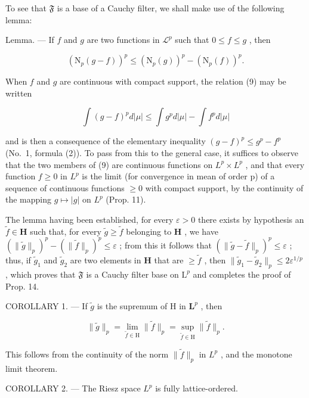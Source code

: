 To see that \(\mathfrak{F}\) is a base of a Cauchy filter, we shall make use of the following lemma:

Lemma. --- If \(f\) and \(g\) are two functions in \(\mathcal{L}^p\) such that \(0 \leqslant f \leqslant g\) , then

\[
\left(\mathrm{N} _ {p} (g - f)\right) ^ {p} \leqslant \left(\mathrm{N} _ {p} (g)\right) ^ {p} - \left(\mathrm{N} _ {p} (f)\right) ^ {p}.\tag{9}
\]

When \(f\) and \(g\) are continuous with compact support, the relation (9) may be written

\[
\int (g - f) ^ {p} d | \mu | \leqslant \int g ^ {p} d | \mu | - \int f ^ {p} d | \mu |
\]

and is then a consequence of the elementary inequality \((g - f)^{p} \leqslant g^{p} - f^{p}\) (No.~1, formula (2)). To pass from this to the general case, it suffices to observe that the two members of (9) are continuous functions on \(L^{p} \times L^{p}\) , and that every function \(f \geqslant 0\) in \(L^{p}\) is the limit (for convergence in mean of order p) of a sequence of continuous functions \(\geqslant 0\) with compact support, by the continuity of the mapping \(g \mapsto |g|\) on \(L^{p}\) (Prop. 11).

The lemma having been established, for every \(\varepsilon > 0\) there exists by hypothesis an \(\widetilde{f} \in \mathbf{H}\) such that, for every \(\widetilde{g} \geqslant \widetilde{f}\) belonging to \(\mathbf{H}\) , we have \((\|\widetilde{g}\|_p)^p - (\|\widetilde{f}\|_p)^p \leqslant \varepsilon\) ; from this it follows that \((\|\widetilde{g} - \widetilde{f}\|_p)^p \leqslant \varepsilon\) ; thus, if \(\widetilde{g}_1\) and \(\widetilde{g}_2\) are two elements in \(\mathbf{H}\) that are \(\geqslant \widetilde{f}\) , then \(\|\widetilde{g}_1 - \widetilde{g}_2\|_p \leqslant 2\varepsilon^{1/p}\) , which proves that \(\mathfrak{F}\) is a Cauchy filter base on \(\mathrm{L}^p\) and completes the proof of Prop. 14.

COROLLARY 1. --- If \(\widetilde{g}\) is the supremum of H in \(\mathbf{L}^p\) , then

\[
\| \widetilde {g} \| _ {p} = \lim _ {\widetilde {f} \in \mathrm{H}} \| \widetilde {f} \| _ {p} = \sup _ {\widetilde {f} \in \mathrm{H}} \| \widetilde {f} \| _ {p}.\tag{10}
\]

This follows from the continuity of the norm \(\|\widetilde{f}\|_{p}\) in \(L^{p}\) , and the monotone limit theorem.

COROLLARY 2. --- The Riesz space \(L^{p}\) is fully lattice-ordered.

